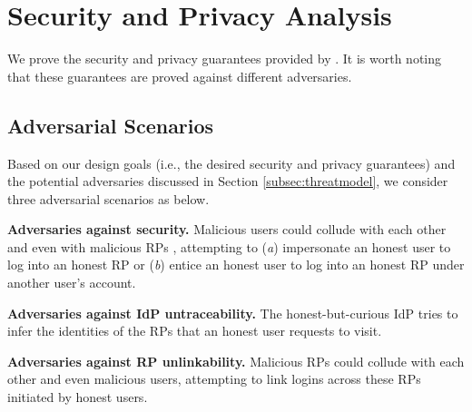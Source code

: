 \section{Security and Privacy Analysis}
\label{sec:analysis}


We prove the security and privacy guarantees provided by \usso.
It is worth noting that these guarantees are proved against different adversaries.


\subsection{Adversarial Scenarios}

Based on our design goals (i.e., the desired security and privacy guarantees) and the potential adversaries discussed in Section \ref{subsec:threatmodel}, we consider three adversarial scenarios as below.

\noindent\textbf{Adversaries against security.} Malicious users could collude with each other and even with malicious RPs \cite{FettKS14,BrowserID,SPRESSO}, attempting to (\emph{a}) impersonate an honest user to log into an honest RP or (\emph{b}) entice an honest user to log into an honest RP under another user's account.

\noindent\textbf{Adversaries against IdP untraceability.}
The honest-but-curious IdP tries to infer the identities of the RPs that an honest user requests to visit. %

\noindent\textbf{Adversaries against RP unlinkability.}
Malicious RPs could collude with each other and even malicious users, attempting to link logins across these RPs initiated by honest users. 





